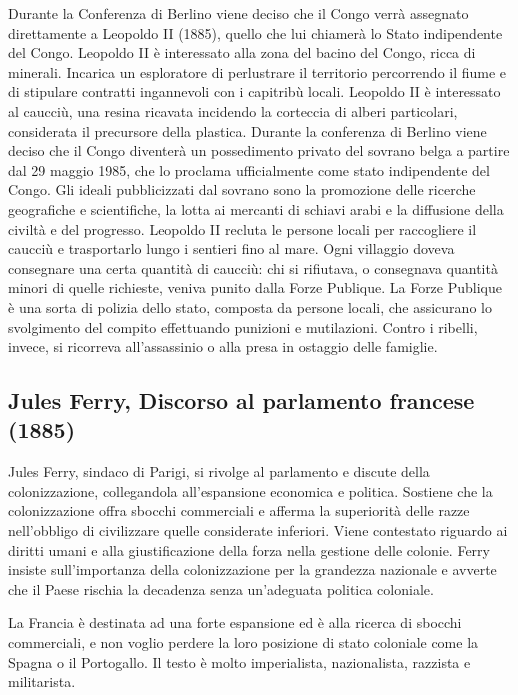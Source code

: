 \documentclass[a4paper]{article}
\begin{document}
Durante la Conferenza di Berlino viene deciso che il Congo verrà assegnato
direttamente a Leopoldo II (1885), quello che lui chiamerà lo Stato indipendente del Congo.
Leopoldo II è interessato alla zona del bacino del Congo, ricca di
minerali. Incarica un esploratore di perlustrare il territorio percorrendo il fiume e di stipulare
contratti ingannevoli con i capitribù locali. Leopoldo II è interessato al caucciù, una resina
ricavata incidendo la corteccia di alberi particolari, considerata il precursore della plastica.
Durante la conferenza di Berlino viene deciso che il Congo diventerà un possedimento
privato del sovrano belga a partire dal 29 maggio 1985, che lo proclama ufficialmente come
stato indipendente del Congo. Gli ideali pubblicizzati dal sovrano sono la promozione delle
ricerche geografiche e scientifiche, la lotta ai mercanti di schiavi arabi e la diffusione della
civiltà e del progresso. Leopoldo II recluta le persone locali per raccogliere il caucciù e
trasportarlo lungo i sentieri fino al mare. Ogni villaggio doveva consegnare una certa
quantità di caucciù: chi si rifiutava, o consegnava quantità minori di quelle richieste, veniva
punito dalla Forze Publique. La Forze Publique è una sorta di polizia dello stato, composta
da persone locali, che assicurano lo svolgimento del compito effettuando punizioni e
mutilazioni. Contro i ribelli, invece, si ricorreva all'assassinio o alla presa in ostaggio delle
famiglie.

\pagebreak

\subsection{Jules Ferry, Discorso al parlamento francese (1885)}

Jules Ferry, sindaco di Parigi, si rivolge al parlamento e
discute della colonizzazione, collegandola all'espansione economica e politica.
Sostiene che la colonizzazione offra sbocchi commerciali e afferma la superiorità delle razze
nell'obbligo di civilizzare quelle considerate inferiori.
Viene contestato riguardo ai diritti umani e alla giustificazione della forza nella
gestione delle colonie.
Ferry insiste sull'importanza della colonizzazione per la grandezza nazionale e
avverte che il Paese rischia la decadenza senza un'adeguata politica coloniale.

La Francia è destinata ad una forte espansione ed è alla ricerca di sbocchi commerciali,
e non voglio perdere la loro posizione di stato coloniale come la Spagna o il Portogallo.
Il testo è molto imperialista, nazionalista, razzista e militarista.
\end{document}
